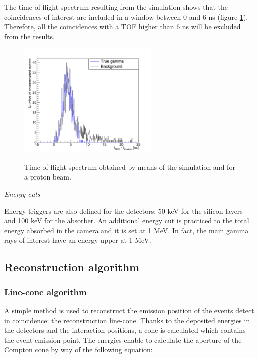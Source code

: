 \documentclass[11pt]{iopart}
\begin{document}
The time of flight spectrum resulting from the simulation shows that the coincidences of interest are included in a window between 0 and 6 ns (figure \ref{fig:fig_TOF_distribution_CC_simulation_Hadronth}). Therefore, all the coincidences with a TOF higher than 6 ns will be excluded from the results. 

	\begin{figure} [!hbtp]	
	\centering
	\caption{Time of flight spectrum obtained by means of the simulation and for a proton beam.}	
	\includegraphics[width=0.6\textwidth]{./Figure/2015_01_04_TOF_spectra_NoCut_1Proton_ResolTemporelle_applied_these.jpg}
	\label{fig:fig_TOF_distribution_CC_simulation_Hadronth}
	\end{figure}

\textit{Energy cuts}\newline

Energy triggers are also defined for the detectors: 50 keV for the silicon layers and 100 keV for the absorber. An additional energy cut is practiced to the total energy absorbed in the camera and it is set at 1 MeV. In fact, the main gamma rays of interest have an energy upper at 1 MeV.

\subsection{Reconstruction algorithm}

\subsubsection{Line-cone algorithm}
A simple method is used to reconstruct the emission position of the events detect in coincidence: the reconstruction line-cone. Thanks to the deposited energies in the detectors and the interaction positions, a cone is calculated which contains the event emission point. The energies enable to calculate the aperture of the Compton cone by way of the following equation:
\end{document}
